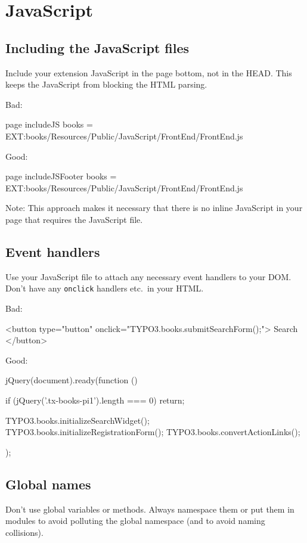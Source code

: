 \chapter{JavaScript}

\section{Including the JavaScript files}

Include your extension JavaScript in the page bottom, not in the HEAD. This keeps the JavaScript from blocking the HTML parsing.

Bad:

\begin{textcode}
page {
  includeJS {
    books = EXT:books/Resources/Public/JavaScript/FrontEnd/FrontEnd.js
  }
}
\end{textcode}

Good:

\begin{textcode}
page {
  includeJSFooter {
    books = EXT:books/Resources/Public/JavaScript/FrontEnd/FrontEnd.js
  }
}
\end{textcode}

Note: This approach makes it necessary that there is no inline JavaScript in your page that requires the JavaScript file.


\section{Event handlers}
Use your JavaScript file to attach any necessary event handlers to your DOM. Don't have any \texttt{onclick} handlers etc.~in your HTML.

Bad:

\begin{htmlcode}
<button type="button" onclick="TYPO3.books.submitSearchForm();">
  Search
</button>
\end{htmlcode}

Good:

\begin{jscode}
jQuery(document).ready(function () {
    if (jQuery('.tx-books-pi1').length === 0) {
        return;
    }

    TYPO3.books.initializeSearchWidget();
    TYPO3.books.initializeRegistrationForm();
    TYPO3.books.convertActionLinks();
});
\end{jscode}


\section{Global names}

Don’t use global variables or methods. Always namespace them or put them in modules to avoid polluting the global namespace (and to avoid naming collisions).
